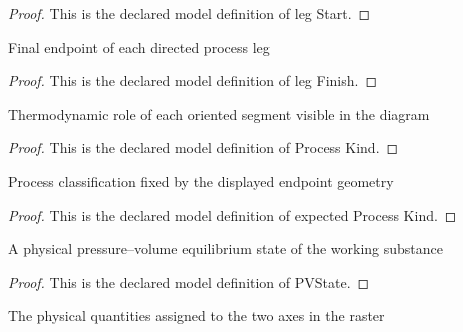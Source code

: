 \begin{proof}
  This is the declared model definition of leg Start.
\end{proof}
\begin{definition}
  \label{def:physics:phyx-mini-0420:phyxminiproblems-problemphyxmini0420-legfinish}
  Final endpoint of each directed process leg
\end{definition}
\begin{proof}
  This is the declared model definition of leg Finish.
\end{proof}
\begin{definition}
  \label{def:physics:phyx-mini-0420:phyxminiproblems-problemphyxmini0420-processkind}
  Thermodynamic role of each oriented segment visible in the diagram
\end{definition}
\begin{proof}
  This is the declared model definition of Process Kind.
\end{proof}
\begin{definition}
  \label{def:physics:phyx-mini-0420:phyxminiproblems-problemphyxmini0420-expectedprocesskind}
  Process classification fixed by the displayed endpoint geometry
\end{definition}
\begin{proof}
  This is the declared model definition of expected Process Kind.
\end{proof}
\begin{definition}[PVState]
  \label{def:physics:phyx-mini-0420:phyxminiproblems-problemphyxmini0420-pvstate}
  A physical pressure--volume equilibrium state of the working substance
\end{definition}
\begin{proof}
  This is the declared model definition of PVState.
\end{proof}
\begin{definition}
  \label{def:physics:phyx-mini-0420:phyxminiproblems-problemphyxmini0420-diagramaxisquantity}
  The physical quantities assigned to the two axes in the raster
\end{definition}

